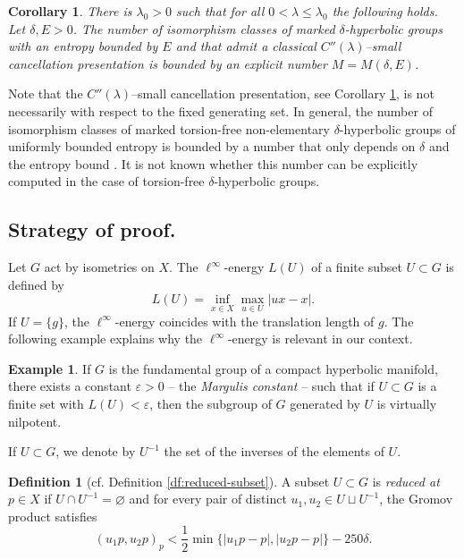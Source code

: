 \documentclass[leqno,a4paper,10pt]{amsart}
\theoremstyle{plain}
\newtheorem{cor}[thm]{Corollary}
\theoremstyle{definition}
\newtheorem{df}[thm]{Definition}
\newtheorem{ex}[thm]{Example}
\theoremstyle{remark}
\begin{document}
 \begin{cor}\label{IC:finiteness} There is $\lambda_0>0$ such that for all $0< \lambda \leqslant \lambda_0$ the following holds. Let $\delta,E>0$. The number of isomorphism classes of marked $\delta$-hyperbolic groups with an entropy bounded by $E$ and that admit a classical $C''(\lambda)$--small cancellation   presentation is bounded by an explicit number $M=M(\delta,E)$.  
 \end{cor}
 Note that the $C''(\lambda)$--small cancellation presentation, see Corollary \ref{IC:finiteness}, is not necessarily with respect to the fixed generating set.  In general, the number of isomorphism classes of marked torsion-free non-elementary $\delta$-hyperbolic groups of uniformly bounded entropy is bounded by a number that only depends on $\delta$ and the entropy bound \cite[Theorem 1.4]{besson_finiteness_2021}. It is not known whether this number can be explicitly computed in the case of torsion-free $\delta$-hyperbolic groups. 
 

\subsection{Strategy of proof.} 
Let  $G$ act by isometries on $X$. The $\ell^{\infty}$-energy $L(U)$ of a finite subset $U\subset G$ is defined by 
$$
L(U)=\inf_{x\in X} \max_{u\in U} |ux-x|.
$$
If $U=\{g\}$, the $\ell^{\infty}$-energy coincides with the translation length of $g$. The following example explains why the $\ell^{\infty}$-energy is relevant in our context. 

\begin{ex}If $G$ is the fundamental group of a compact hyperbolic manifold, there exists a constant $\varepsilon>0$ -- the \emph{Margulis constant} -- such that if $U\subset G$ is a finite set with $L(U)<\varepsilon$, then the subgroup of $G$ generated by $U$ is virtually nilpotent.
\end{ex} 


If $U\subset G$, we denote by $U^{-1}$ the set of the inverses of the elements of $U$. 

\begin{df}[cf. Definition \ref{df:reduced-subset}]\label{DI:reduced}
A subset $U\subset G$ is \emph{reduced at} $p\in X$ if $U\cap U^{-1}=\varnothing$ and for every pair of distinct $u_1, u_2 \in U\sqcup U^{-1}$, the Gromov product satisfies
	$$
	(u_1p, u_2p)_p<\frac{1}{2}\min\{|u_1p-p|,|u_2p-p|\}-250\delta.
	$$	
\end{df} 
\end{document}
